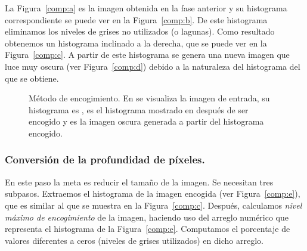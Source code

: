 La Figura~\ref{comp:a} es la imagen obtenida en la fase anterior y su
histograma correspondiente se puede ver en la Figura~\ref{comp:b}. De este
histograma eliminamos los niveles de grises no utilizados (o lagunas). Como
resultado obtenemos un histograma inclinado a la derecha, que se puede ver en
la Figura~\ref{comp:c}. A partir de este histograma se genera una nueva imagen
que luce muy oscura (ver Figura~\ref{comp:d}) debido a la naturaleza del
histograma del que se obtiene.

\begin{figure}[h]
  \begin{center}
    \hspace{12pt}

    \bigskip

    \hspace{12pt}
  \end{center}

  \caption[Método de encogimiento]{Método de encogimiento. En
  \protect{} se visualiza la imagen de entrada, su histograma es
  \protect{}, \protect{} es el histograma  mostrado
  en \protect{} después de ser encogido y \protect{}
  es la imagen oscura generada a partir del histograma encogido.}

  \label{img:shrinking-one}
\end{figure}

\subsubsection{Conversión de la profundidad de píxeles.}

En este paso la meta es reducir el tamaño de la imagen. Se necesitan tres
subpasos. Extraemos el histograma de la imagen encogida (ver
Figura~\ref{comp:e}), que es similar al que se muestra en la
Figura~\ref{comp:c}. Después, calculamos \textit{nivel máximo de encogimiento}
de la imagen, haciendo uso del arreglo numérico que representa el histograma de
la Figura~\ref{comp:e}. Computamos el porcentaje de valores diferentes a ceros
(niveles de grises utilizados) en dicho arreglo.

